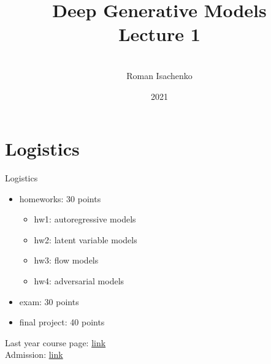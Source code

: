 \documentclass{beamer}
\title[\hbox to 56mm{Deep Generative Models  \hfill\insertframenumber\,/\,\inserttotalframenumber}]
{Deep Generative Models \\ Lecture 1}
\author[Roman Isachenko]{\\Roman Isachenko}
\institute[Ozon]{Ozon Masters \\
}
\date{2021}
\begin{document}
\begin{frame}
\titlepage
\end{frame}
\section{Logistics}
\begin{frame}{Logistics}
    \begin{itemize}
        \item homeworks: 30 points
        \begin{itemize}
            \item hw1: autoregressive models
            \item hw2: latent variable models
            \item hw3: flow models
            \item hw4: adversarial models
        \end{itemize}
        \item exam: 30 points
        \item final project: 40 points
    \end{itemize}
    Last year course page: \href{http://bit.ly/IS_B2}{link} \\
    Admission: \href{https://docs.google.com/spreadsheets/d/1FpTneCfkYNIG1FMxG7ALTwMCGDngkqc_OJC6SDqeG0Q/edit?usp=sharing}{link}
\end{frame}
\end{document}
